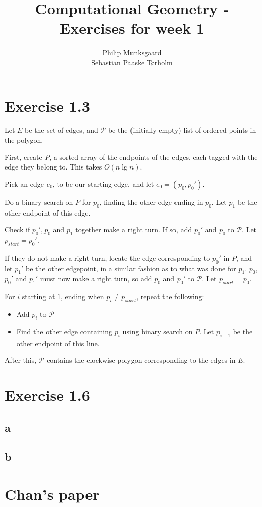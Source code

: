 \documentclass[11pt,a4paper]{article}
\title{Computational Geometry - Exercises for week 1}
\author{Philip Munksgaard\\Sebastian Paaske Tørholm}
\begin{document}
\maketitle

\section{Exercise 1.3}
Let $E$ be the set of edges, and $\mathcal{P}$ be the (initially empty) list of
ordered points in the polygon.

First, create $P$, a sorted array of the endpoints of the edges, each tagged
with the edge they belong to. This takes $O(n \lg n)$.

Pick an edge $e_0$, to be our starting edge, and let $e_0 = (p_0, p_0')$.

Do a binary search on $P$ for $p_0$, finding the other edge ending in $p_0$. Let
$p_1$ be the other endpoint of this edge.

Check if $p_0', p_0$ and $p_1$ together make a right turn. If so, add $p_0'$ and
$p_0$ to $\mathcal{P}$. Let $p_{start} = p_0'$.

If they do not make a right turn, locate the edge corresponding to $p_0'$ in
$P$, and let $p_1'$ be the other edgepoint, in a similar fashion as to what
was done for $p_1$. $p_0$, $p_0'$ and $p_1'$ must now make a right turn, so add
$p_0$ and $p_0'$ to $\mathcal{P}$. Let $p_{start} = p_0$.

For $i$ starting at $1$, ending when $p_i \neq p_{start}$, repeat the following: 
\begin{itemize}
    \item Add $p_i$ to $\mathcal{P}$
    \item Find the other edge containing $p_i$ using binary search on $P$. Let $p_{i+1}$
          be the other endpoint of this line.
\end{itemize}

After this, $\mathcal{P}$ contains the clockwise polygon corresponding to the
edges in $E$.

\section{Exercise 1.6}

\subsection{a}

\subsection{b}

\section{Chan's paper}
\end{document}
